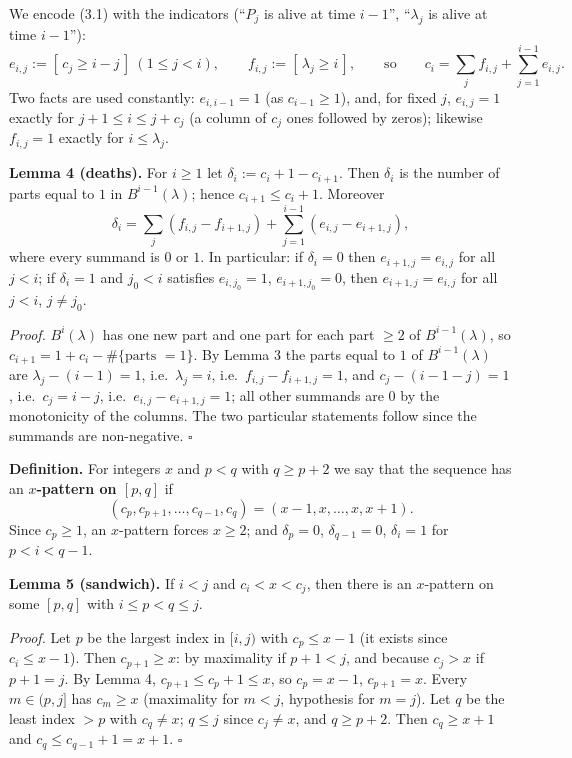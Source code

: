 We encode (3.1) with the indicators (``\(P_j\) is alive at time
\(i-1\)'', ``\(\lambda_j\) is alive at time \(i-1\)''):
\[e_{i,j}:=[\,c_j\ge i-j\,]\ (1\le j<i),\qquad f_{i,j}:=[\,\lambda_j\ge i\,],\qquad\text{so}\qquad c_i=\sum_{j}f_{i,j}+\sum_{j=1}^{i-1}e_{i,j}.\tag{3.2}\]
Two facts are used constantly: \(e_{i,i-1}=1\) (as \(c_{i-1}\ge1\)),
and, for fixed \(j\), \(e_{i,j}=1\) exactly for \(j+1\le i\le j+c_j\) (a
column of \(c_j\) ones followed by zeros); likewise \(f_{i,j}=1\)
exactly for \(i\le\lambda_j\).

\textbf{Lemma 4 (deaths).} For \(i\ge1\) let
\(\delta_i:=c_i+1-c_{i+1}\). Then \(\delta_i\) is the number of parts
equal to \(1\) in \(B^{i-1}(\lambda)\); hence \(c_{i+1}\le c_i+1\).
Moreover
\[\delta_i=\sum_j (f_{i,j}-f_{i+1,j})+\sum_{j=1}^{i-1}(e_{i,j}-e_{i+1,j}),\]
where every summand is \(0\) or \(1\). In particular: if \(\delta_i=0\)
then \(e_{i+1,j}=e_{i,j}\) for all \(j<i\); if \(\delta_i=1\) and
\(j_0<i\) satisfies \(e_{i,j_0}=1\), \(e_{i+1,j_0}=0\), then
\(e_{i+1,j}=e_{i,j}\) for all \(j<i\), \(j\ne j_0\).

\emph{Proof.} \(B^{i}(\lambda)\) has one new part and one part for each
part \(\ge2\) of \(B^{i-1}(\lambda)\), so
\(c_{i+1}=1+c_i-\#\{\text{parts }=1\}\). By Lemma 3 the parts equal to
\(1\) of \(B^{i-1}(\lambda)\) are \(\lambda_j-(i-1)=1\),
i.e.~\(\lambda_j=i\), i.e.~\(f_{i,j}-f_{i+1,j}=1\), and
\(c_j-(i-1-j)=1\), i.e.~\(c_j=i-j\), i.e.~\(e_{i,j}-e_{i+1,j}=1\); all
other summands are \(0\) by the monotonicity of the columns. The two
particular statements follow since the summands are non-negative.
\(\square\)

\textbf{Definition.} For integers \(x\) and \(p<q\) with \(q\ge p+2\) we
say that the sequence has an \textbf{\(x\)-pattern on \([p,q]\)} if
\[(c_p,c_{p+1},\dots,c_{q-1},c_q)=(x-1,x,\dots,x,x+1).\] Since
\(c_p\ge1\), an \(x\)-pattern forces \(x\ge2\); and \(\delta_p=0\),
\(\delta_{q-1}=0\), \(\delta_i=1\) for \(p<i<q-1\).

\textbf{Lemma 5 (sandwich).} If \(i<j\) and \(c_i<x<c_j\), then there is
an \(x\)-pattern on some \([p,q]\) with \(i\le p<q\le j\).

\emph{Proof.} Let \(p\) be the largest index in \([i,j)\) with
\(c_p\le x-1\) (it exists since \(c_i\le x-1\)). Then \(c_{p+1}\ge x\):
by maximality if \(p+1<j\), and because \(c_j>x\) if \(p+1=j\). By Lemma
4, \(c_{p+1}\le c_p+1\le x\), so \(c_p=x-1\), \(c_{p+1}=x\). Every
\(m\in(p,j]\) has \(c_m\ge x\) (maximality for \(m<j\), hypothesis for
\(m=j\)). Let \(q\) be the least index \(>p\) with \(c_q\ne x\);
\(q\le j\) since \(c_j\ne x\), and \(q\ge p+2\). Then \(c_q\ge x+1\) and
\(c_q\le c_{q-1}+1=x+1\). \(\square\)

